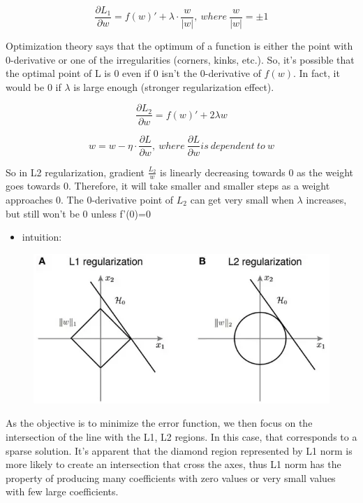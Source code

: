\documentclass[11pt]{article}
\makeatletter
\def\maxwidth{\ifdim\Gin@nat@width>\linewidth\linewidth
    \else\Gin@nat@width\fi}
\let\Oldincludegraphics\includegraphics
\renewcommand{\includegraphics}[1]{\Oldincludegraphics[width=.8\maxwidth]{#1}}
\providecommand{\tightlist}{%
      \setlength{\itemsep}{0pt}\setlength{\parskip}{0pt}}
\makeatother
\begin{document}
\[\frac{\partial L_1}{\partial w} = f(w)' + \lambda \cdot \frac{w}{|w|}, \: where \: \frac{w}{|w|} = \pm 1\]

Optimization theory says that the optimum of a function is either the point with 0-derivative or one of the irregularities (corners, kinks, etc.). So, it's possible that the optimal point of L is 0 even if 0 isn't the 0-derivative of \(f(w)\). In fact, it would be 0 if \(\lambda\) is large enough (stronger regularization effect). 

\[\frac{\partial L_2}{\partial w} = f(w)' + 2 \lambda w\]

\[w = w - \eta \cdot \frac{\partial L}{\partial w}, \: where \: \frac{\partial L}{\partial w}  is \: dependent \: to \: w\]

So in L2 regularization, gradient \(\frac{L_2}{w}\) is linearly
decreasing towards 0 as the weight goes towards 0. Therefore, it will
take smaller and smaller steps as a weight approaches 0.
 The 0-derivative point of \(L_2\) can get very small when  \(\lambda\) increases, but still won't be 0 unless  f'(0)=0

\begin{itemize}
\tightlist
\item
  intuition:
\end{itemize}

\begin{figure}[H]
\centering
\includegraphics{l1l2.png}
\caption{}
\end{figure}

As the objective is to minimize the error function,
we then focus on the intersection of the line with the L1, L2
regions.  In this case, that corresponds to a sparse solution. It's apparent that the diamond region represented by L1 norm is
more likely to create an intersection that cross the axes, thus L1 norm has the property of producing many coefficients with zero values or very small values with few large coefficients. 


    
    
    
    
\end{document}
